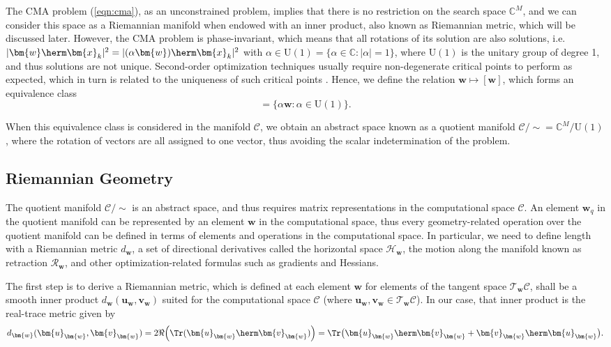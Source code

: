 The CMA problem (\ref{eqn:cma}), as an unconstrained problem, implies that there is no restriction on the search space $\mathbb{C}^M$, and we can consider this space as a Riemannian manifold when endowed with an inner product, also known as Riemannian metric, which will be discussed later. However, the CMA problem is phase-invariant, which means that all rotations of its solution are also solutions, i.e. $|\bm{w}\herm\bm{x}_{k}|^2=|(\alpha\bm{w})\herm\bm{x}_{k}|^2$ with $\alpha\in\text{U}(1)=\{\alpha\in\mathbb{C}:|\alpha|=1\}$, where $\text{U}(1)$ is the unitary group of degree 1, and thus solutions are not unique. Second-order optimization techniques usually require non-degenerate critical points to perform as expected, which in turn is related to the uniqueness of such critical points \cite{}. Hence, we define the relation $\bm{w}\mapsto[\bm{w}]$, which forms an equivalence class
\begin{equation}
[\bm{w}]=\{\alpha\bm{w}:\alpha \in \text{U}(1)\}.\label{eqn:equivalenceclass}
\end{equation}

When this equivalence class is considered in the manifold $\mathcal{C}$, we obtain an abstract space known as a quotient manifold $\mathcal{C}/{\sim}=\mathbb{C}^M/\text{U}(1)$, where the rotation of vectors are all assigned to one vector, thus avoiding the scalar indetermination of the problem. 

\subsection{Riemannian Geometry}

The quotient manifold $\mathcal{C}/{\sim}$ is an abstract space, and thus requires matrix representations in the computational space $\mathcal{C}$. An element ${\bm{w}}_q$ in the quotient manifold can be represented by an element $\bm{w}$ in the computational space, thus every geometry-related operation over the quotient manifold can be defined in terms of elements and operations in the computational space.
In particular, we need to define length with a Riemannian metric $d_{\bm{w}}$, a set of directional derivatives called the horizontal space $\mathcal{H}_{\bm{w}}$, the motion along the manifold known as retraction $\mathcal{R}_{\bm{w}}$, and other optimization-related formulas such as gradients and Hessians. 

The first step is to derive a Riemannian metric, which is defined at each element $\bm{w}$ for elements of the tangent space $\mathcal{T}_{\bm{w}}\mathcal{C}$, shall be a smooth inner product $d_{\bm{w}}(\bm{u}_{\bm{w}},\bm{v}_{\bm{w}})$ suited for the computational space $\mathcal{C}$ (where $\bm{u}_{\bm{w}},\bm{v}_{\bm{w}}\in\mathcal{T}_{\bm{w}}\mathcal{C}$). In our case, that inner product is the real-trace metric given by
\begin{equation}
d_{\bm{w}}(\bm{u}_{\bm{w}},\bm{v}_{\bm{w}})=2\Re\Big(\Tr(\bm{u}_{\bm{w}}\herm\bm{v}_{\bm{w}})\Big)=\Tr\big(\bm{u}_{\bm{w}}\herm\bm{v}_{\bm{w}}+\bm{v}_{\bm{w}}\herm\bm{u}_{\bm{w}}\big).
\end{equation} 

